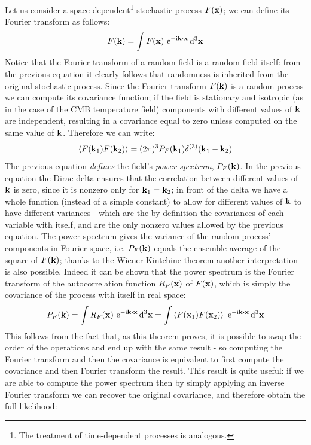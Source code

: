 Let us consider a space-dependent\footnote{The treatment of time-dependent processes is analogous.} stochastic process $F(\vb{x})$; we can define its Fourier transform as follows:
\begin{equation*}
    F(\vb{k}) = \int F(\vb{x}) \  \mathrm{e}^{-\mathrm{i}\vb{k}\vdot\vb{x}} \dd[3]{\vb{x}}
\end{equation*}
Notice that the Fourier transform of a random field is a random field itself: from the previous equation it clearly follows that randomness is inherited from the original stochastic process. Since the Fourier transform $F(\vb{k})$ is a random process we can compute its covariance function; if the field is stationary and isotropic (as in the case of the CMB temperature field) components with different values of $\vb{k}$ are independent, resulting in a covariance equal to zero unless computed on the same value of $\vb{k}$. Therefore we can write:
\begin{equation}
\label{eq:power_spectrum_definition}
    \expval{F(\vb{k}_1) F(\vb{k}_2)} = (2\pi)^3 P_F(\vb{k}_1) \delta^{(3)}(\vb{k}_1 - \vb{k}_2)
\end{equation}
The previous equation \emph{defines} the field's \emph{power spectrum}, $P_F(\vb{k})$. In the previous equation the Dirac delta ensures that the correlation between different values of $\vb{k}$ is zero, since it is nonzero only for $\vb{k}_1 = \vb{k}_2$; in front of the delta we have a whole function (instead of a simple constant) to allow for different values of $\vb{k}$ to have different variances - which are the by definition the covariances of each variable with itself, and are the only nonzero values allowed by the previous equation.
The power spectrum gives the variance of the random process' components in Fourier space, i.e. $P_F(\vb{k})$ equals the ensemble average of the square of $F(\vb{k})$; thanks to the Wiener-Kintchine theorem another interpretation is also possible. 
Indeed it can be shown that the power spectrum is the Fourier transform of the autocorrelation function $R_F(\vb{x})$ of $F(\vb{x})$, which is simply the covariance of the process with itself in real space:
\begin{equation*}
    P_F(\vb{k}) = \int R_F(\vb{x}) \  \mathrm{e}^{-\mathrm{i}\vb{k}\vdot\vb{x}} \dd[3]{\vb{x}} = \int \expval{F(\vb{x}_1) F(\vb{x}_2)} \  \mathrm{e}^{-\mathrm{i}\vb{k}\vdot\vb{x}} \dd[3]{\vb{x}}
\end{equation*}
This follows from the fact that, as this theorem proves, it is possible to swap the order of the operations and end up with the same result - so computing the Fourier transform and then the covariance is equivalent to first compute the covariance and then Fourier transform the result. This result is quite useful: if we are able to compute the power spectrum then by simply applying an inverse Fourier transform we can recover the original covariance, and therefore obtain the full likelihood:
